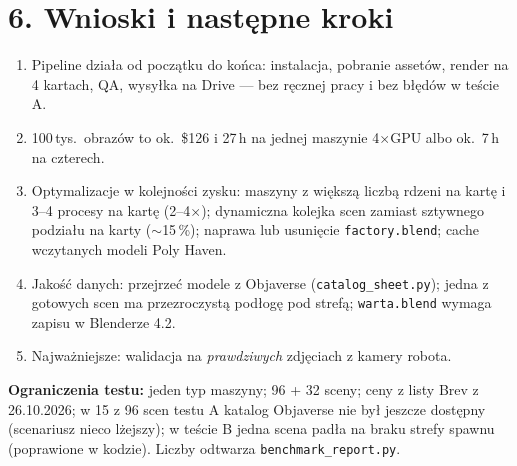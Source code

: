 \documentclass[10pt,a4paper]{article}
\begin{document}
\section*{6. Wnioski i następne kroki}
\begin{enumerate}\itemsep0pt
\item Pipeline działa od początku do końca: instalacja, pobranie assetów, render na 4 kartach, QA, wysyłka na Drive --- bez ręcznej pracy i bez błędów w teście A.
\item 100\,tys.\ obrazów to ok.\ \$126 i 27\,h na jednej maszynie 4$\times$GPU albo ok.\ 7\,h na czterech.
\item Optymalizacje w kolejności zysku: maszyny z większą liczbą rdzeni na kartę i 3--4 procesy na kartę (2--4$\times$); dynamiczna kolejka scen zamiast sztywnego podziału na karty ($\sim$15\,\%); naprawa lub usunięcie \texttt{factory.blend}; cache wczytanych modeli Poly Haven.
\item Jakość danych: przejrzeć modele z Objaverse (\texttt{catalog\_sheet.py}); jedna z gotowych scen ma przezroczystą podłogę pod strefą; \texttt{warta.blend} wymaga zapisu w Blenderze 4.2.
\item Najważniejsze: walidacja na \emph{prawdziwych} zdjęciach z kamery robota.
\end{enumerate}

{\footnotesize\textbf{Ograniczenia testu:} jeden typ maszyny; 96 + 32 sceny; ceny z listy Brev z 26.10.2026; w 15 z 96 scen testu A katalog Objaverse nie był jeszcze dostępny (scenariusz nieco lżejszy); w teście B jedna scena padła na braku strefy spawnu (poprawione w kodzie). Liczby odtwarza \texttt{benchmark\_report.py}.}
\end{document}
